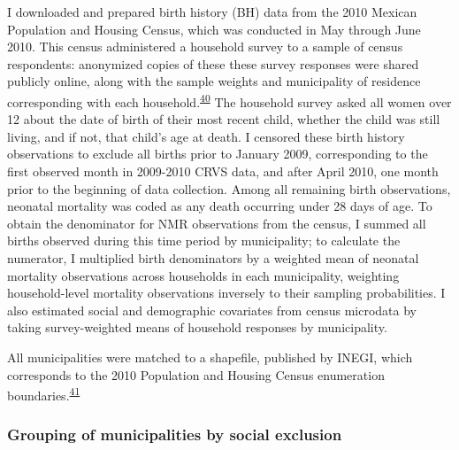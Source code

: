 \documentclass[
]{article}
\begin{document}
I downloaded and prepared birth history (BH) data from the 2010 Mexican Population and Housing Census, which was conducted in May through June 2010. This census administered a household survey to a sample of census respondents: anonymized copies of these these survey responses were shared publicly online, along with the sample weights and municipality of residence corresponding with each household.\textsuperscript{\protect\hyperlink{ref-INEGI2010a}{40}} The household survey asked all women over 12 about the date of birth of their most recent child, whether the child was still living, and if not, that child's age at death. I censored these birth history observations to exclude all births prior to January 2009, corresponding to the first observed month in 2009-2010 CRVS data, and after April 2010, one month prior to the beginning of data collection. Among all remaining birth observations, neonatal mortality was coded as any death occurring under 28 days of age. To obtain the denominator for NMR observations from the census, I summed all births observed during this time period by municipality; to calculate the numerator, I multiplied birth denominators by a weighted mean of neonatal mortality observations across households in each municipality, weighting household-level mortality observations inversely to their sampling probabilities. I also estimated social and demographic covariates from census microdata by taking survey-weighted means of household responses by municipality.

All municipalities were matched to a shapefile, published by INEGI, which corresponds to the 2010 Population and Housing Census enumeration boundaries.\textsuperscript{\protect\hyperlink{ref-INEGI2010b}{41}}

\hypertarget{grouping-of-municipalities-by-social-exclusion}{%
\subsubsection{Grouping of municipalities by social exclusion}\label{grouping-of-municipalities-by-social-exclusion}}
\end{document}
